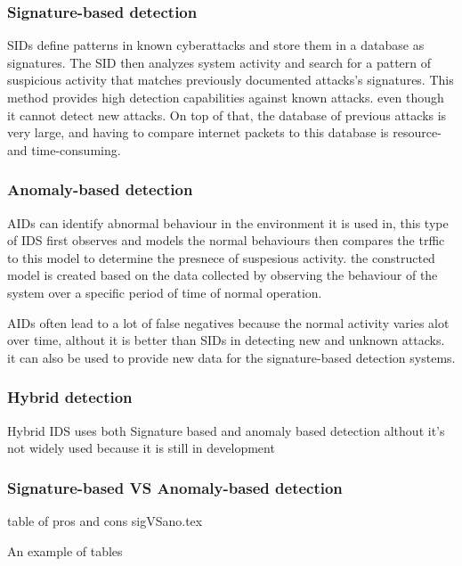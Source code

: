 \subsubsection{Signature-based detection}
SIDs define patterns in known cyberattacks and store them in a database as signatures. The SID then analyzes system activity and search for a pattern of suspicious activity that matches previously documented attacks's signatures. This method provides high detection capabilities against known attacks. even though it cannot detect new attacks. On top of that, the database of previous attacks is very large, and having to compare internet packets to this database is resource- and time-consuming. \cite{NIST-IDS}



\subsubsection{Anomaly-based detection}
AIDs can identify abnormal behaviour in the environment it is used in, this type of IDS first observes and models the normal behaviours then compares the trffic to this model to determine the presnece of suspesious activity. the constructed model is created based on the data collected by observing the behaviour of the system over a specific period of time of normal operation. \cite{NIST-IDS}

AIDs often lead to a lot of false negatives because the normal activity varies alot over time, althout it is better than SIDs in detecting new and unknown attacks. it can also be used to provide new data for the signature-based detection systems. \cite{NIST-IDS}




\subsubsection{Hybrid detection}
Hybrid IDS uses both Signature based and anomaly based detection althout it's not widely used because it is still in development
\clearpage

\subsubsection{Signature-based VS Anomaly-based detection}
table of pros and cons
sigVSano.tex
\begin{table}[h]
	\centering
	\caption{An example of tables}
	
	\label{tab:example}
\end{table}



